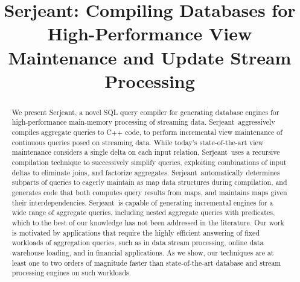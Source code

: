 \documentclass{sig-alternate}
\newcommand{\compiler}{Serjeant}
\begin{document}
\title{Serjeant: Compiling Databases for High-Performance View Maintenance and Update Stream Processing}
\author{
}
\toappear{}
\maketitle

\begin{abstract}
We present \compiler, a novel SQL query compiler for generating database engines
for high-performance main-memory processing of streaming data. \compiler\
aggressively compiles aggregate queries to C++ code, to perform incremental view
maintenance of continuous queries posed on streaming data. While today's
state-of-the-art view maintenance considers a single delta on each input
relation, \compiler\ uses a recursive compilation technique to successively
simplify queries, exploiting combinations of input deltas to eliminate joins,
and factorize aggregates. \compiler\ automatically determines subparts of
queries to eagerly maintain as map data structures during compilation, and
generates code that both computes query results from maps, and maintains maps
given their interdependencies.  \compiler\ is capable of generating incremental
engines for a wide range of aggregate queries, including nested aggregate
queries with predicates, which to the best of our knowledge has not been
addressed in the literature.  Our work is motivated by applications that require
the highly efficient answering of fixed workloads of aggregation queries, such
as in data stream processing, online data warehouse loading, and in financial
applications. As we show, our techniques are at least one to two orders of
magnitude faster than state-of-the-art database and stream processing engines on
such workloads.
\end{abstract}




%







\end{document}

